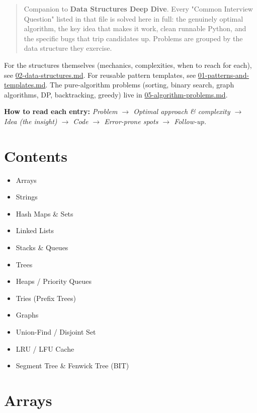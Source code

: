 \documentclass[11pt]{article}
\providecommand{\tightlist}{\setlength{\itemsep}{1pt}\setlength{\parskip}{0pt}}
\begin{document}
\setlength{\parindent}{0pt}\setlength{\parskip}{0.45\baselineskip}

\makecoverpage

\thispagestyle{empty}
{\hypersetup{hidelinks}\tableofcontents}
\clearpage

\begin{quote}
Companion to \textbf{Data Structures Deep Dive}. Every "Common Interview Question" listed in that file is solved here in full: the genuinely optimal algorithm, the key idea that makes it work, clean runnable Python, and the specific bugs that trip candidates up. Problems are grouped by the data structure they exercise.
\end{quote}

For the structures themselves (mechanics, complexities, when to reach for each), see \url{02-data-structures.md}. For reusable pattern templates, see \url{01-patterns-and-templates.md}. The pure-algorithm problems (sorting, binary search, graph algorithms, DP, backtracking, greedy) live in \url{05-algorithm-problems.md}.

\textbf{How to read each entry:} \emph{Problem \(\rightarrow\) Optimal approach \& complexity \(\rightarrow\) Idea (the insight) \(\rightarrow\) Code \(\rightarrow\) Error-prone spots \(\rightarrow\) Follow-up.}

\section{Contents}\label{contents}

\begin{itemize}
\tightlist
\item
  Arrays
\item
  Strings
\item
  Hash Maps \& Sets
\item
  Linked Lists
\item
  Stacks \& Queues
\item
  Trees
\item
  Heaps / Priority Queues
\item
  Tries (Prefix Trees)
\item
  Graphs
\item
  Union-Find / Disjoint Set
\item
  LRU / LFU Cache
\item
  Segment Tree \& Fenwick Tree (BIT)
\end{itemize}

\section{Arrays}\label{arrays}
\end{document}
